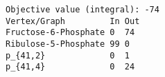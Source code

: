 \begin{verbatim}
Objective value (integral): -74
Vertex/Graph         In Out 
Fructose-6-Phosphate 0  74  
Ribulose-5-Phosphate 99 0   
p_{41,2}             0  1   
p_{41,4}             0  24  
\end{verbatim}
